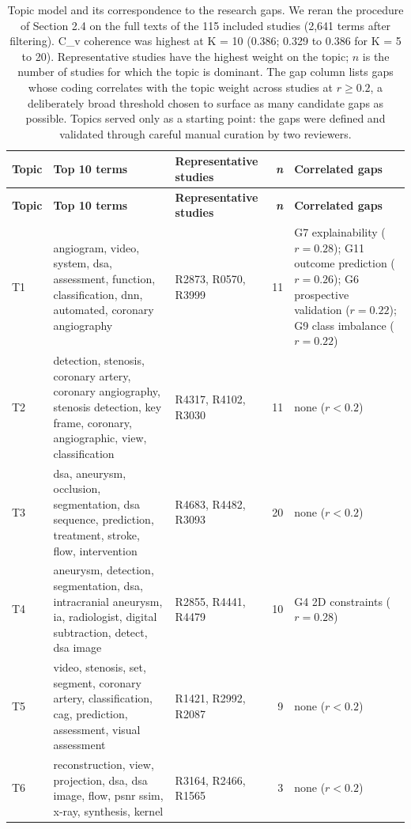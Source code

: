 \begin{longtable}{>{\raggedright\arraybackslash}p{0.7cm} >{\raggedright\arraybackslash}p{6.2cm} >{\raggedright\arraybackslash}p{2.9cm} r >{\raggedright\arraybackslash}p{4.2cm}}
\caption{Topic model and its correspondence to the research gaps. We reran the procedure of Section 2.4 on the full texts of the 115 included studies (2,641 terms after filtering). C\_v coherence was highest at K = 10 (0.386; 0.329 to 0.386 for K = 5 to 20). Representative studies have the highest weight on the topic; $n$ is the number of studies for which the topic is dominant. The gap column lists gaps whose coding correlates with the topic weight across studies at $r \geq 0.2$, a deliberately broad threshold chosen to surface as many candidate gaps as possible. Topics served only as a starting point: the gaps were defined and validated through careful manual curation by two reviewers.}\label{tab:lda_topics}\\
\toprule
\textbf{Topic} & \textbf{Top 10 terms} & \textbf{Representative studies} & \textbf{\textit{n}} & \textbf{Correlated gaps}\\
\midrule\endfirsthead
\toprule
\textbf{Topic} & \textbf{Top 10 terms} & \textbf{Representative studies} & \textbf{\textit{n}} & \textbf{Correlated gaps}\\
\midrule\endhead
\bottomrule\endfoot
T1 & angiogram, video, system, dsa, assessment, function, classification, dnn, automated, coronary angiography & R2873, R0570, R3999 & 11 & G7 explainability ($r=0.28$); G11 outcome prediction ($r=0.26$); G6 prospective validation ($r=0.22$); G9 class imbalance ($r=0.22$)\\
T2 & detection, stenosis, coronary artery, coronary angiography, stenosis detection, key frame, coronary, angiographic, view, classification & R4317, R4102, R3030 & 11 & none ($r<0.2$)\\
T3 & dsa, aneurysm, occlusion, segmentation, dsa sequence, prediction, treatment, stroke, flow, intervention & R4683, R4482, R3093 & 20 & none ($r<0.2$)\\
T4 & aneurysm, detection, segmentation, dsa, intracranial aneurysm, ia, radiologist, digital subtraction, detect, dsa image & R2855, R4441, R4479 & 10 & G4 2D constraints ($r=0.28$)\\
T5 & video, stenosis, set, segment, coronary artery, classification, cag, prediction, assessment, visual assessment & R1421, R2992, R2087 & 9 & none ($r<0.2$)\\
T6 & reconstruction, view, projection, dsa, dsa image, flow, psnr ssim, x-ray, synthesis, kernel & R3164, R2466, R1565 & 3 & none ($r<0.2$)\\

\end{longtable}
